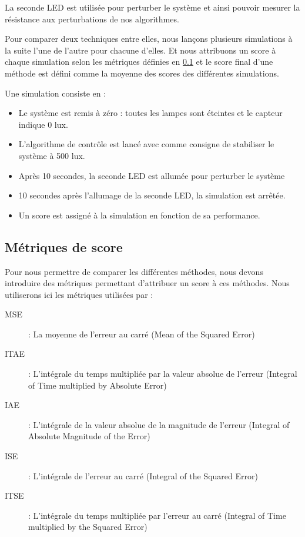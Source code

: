 \documentclass[a4paper,10pt]{report}
\begin{document}
La seconde LED est utilisée pour perturber le système et ainsi pouvoir mesurer la résistance aux perturbations de nos algorithmes.

Pour comparer deux techniques entre elles, nous lançons plusieurs simulations à la suite l'une de l'autre pour chacune d'elles. %
Et nous attribuons un score à chaque simulation selon les métriques définies en \ref{section:metrics} et le score final d'une méthode est défini comme la moyenne des scores des différentes simulations.

Une simulation consiste en :
\begin{itemize}
    \item Le système est remis à zéro : toutes les lampes sont éteintes et le capteur indique 0 lux.
    \item L'algorithme de contrôle est lancé avec comme consigne de stabiliser le système à 500 lux.
    \item Après 10 secondes, la seconde LED est allumée pour perturber le système
    \item 10 secondes après l'allumage de la seconde LED, la simulation est arrêtée.
    \item Un score est assigné à la simulation en fonction de sa performance.
\end{itemize}

\subsection{Métriques de score}
\label{section:metrics}
Pour nous permettre de comparer les différentes méthodes, nous devons introduire des métriques permettant d'attribuer un score à ces méthodes.
Nous utiliserons ici les métriques utilisées par \cite{griffin2003line, mirzal2012pid} :
\begin{description}
    \item[MSE] : La moyenne de l'erreur au carré (Mean of the Squared Error)
    \item[ITAE] : L'intégrale du temps multipliée par la valeur absolue de l'erreur  (Integral of Time multiplied by Absolute Error)
    \item[IAE] : L'intégrale de la valeur absolue de la magnitude de l'erreur (Integral of Absolute Magnitude of the Error)
    \item[ISE] : L'intégrale de l'erreur au carré (Integral of the Squared Error)
    \item[ITSE] : L'intégrale du temps multipliée par l'erreur au carré (Integral of Time multiplied by the Squared Error)
\end{description}
\end{document}
